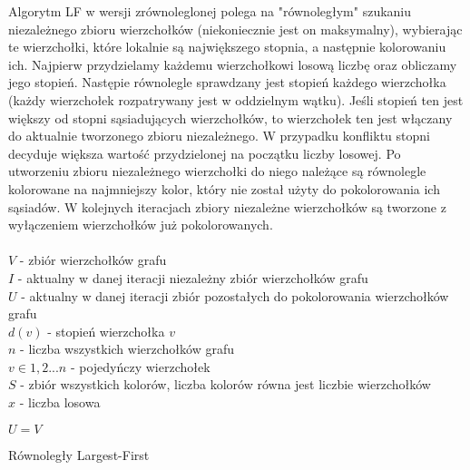 \documentclass{article}
\begin{document}
Algorytm LF w wersji zrównoleglonej polega na "równoległym" szukaniu niezależnego zbioru wierzchołków (niekoniecznie jest on maksymalny), wybierając te wierzchołki, które lokalnie są największego stopnia, a następnie kolorowaniu ich. Najpierw przydzielamy każdemu wierzchołkowi losową liczbę oraz obliczamy jego stopień. Następie równolegle sprawdzany jest stopień każdego wierzchołka (każdy wierzchołek rozpatrywany jest w oddzielnym wątku). Jeśli stopień ten jest większy od stopni sąsiadujących wierzchołków, to wierzchołek ten jest włączany do aktualnie tworzonego zbioru niezależnego. W przypadku konfliktu stopni decyduje większa wartość przydzielonej na początku liczby losowej. Po utworzeniu zbioru niezależnego wierzchołki do niego należące są równolegle kolorowane na  najmniejszy kolor, który nie został użyty do pokolorowania ich sąsiadów. W kolejnych iteracjach zbiory niezależne wierzchołków są tworzone z wyłączeniem wierzchołków już pokolorowanych.  
\\ \\	
	$V$ - zbiór wierzchołków grafu
	\\
	$I$ - aktualny w danej iteracji niezależny zbiór wierzchołków grafu
	\\
	$U$ - aktualny w danej iteracji zbiór pozostałych do pokolorowania wierzchołków grafu
	\\
	$d(v)$ - stopień wierzchołka $v$
	\\
	$n$ - liczba wszystkich wierzchołków grafu
	\\
	$v \in 1,2 ...n$ - pojedyńczy wierzchołek
	\\
	$S$ - zbiór wszystkich kolorów, liczba kolorów równa jest liczbie wierzchołków
	\\
	$x$ - liczba losowa
	 \\ 
\begin{algorithm}[H]
	\SetAlgoLined
	$U = V$
	\\
	\caption{Równoległy Largest-First}
\end{algorithm}
\end{document}
